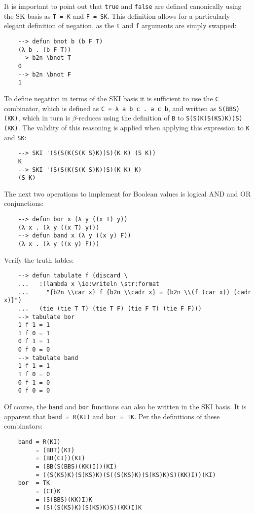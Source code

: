 It is important to point out that \verb|true| and \verb|false| are defined canonically using the SK basis as \verb|T = K| and \verb|F = SK|. This definition allows for a particularly elegant definition of negation, as the \verb|t| and \verb|f| arguments are simply swapped:

\begin{Verbatim}
    --> defun bnot b (b F T)
    (λ b . (b F T))
    --> b2n \bnot T
    0
    --> b2n \bnot F
    1
\end{Verbatim}

To define negation in terms of the SKI basis it is sufficient to use the \verb|C| combinator, which is defined as \verb|C = λ a b c . a c b|, and written as \verb|S(BBS)(KK)|, which in turn is $\beta$-reduces using the definition of \verb|B| to \verb|S(S(K(S(KS)K))S)(KK)|. The validity of this reasoning is applied when applying this expression to \verb|K| and \verb|SK|:

\begin{Verbatim}
    --> SKI '(S(S(K(S(K S)K))S)(K K) (S K))
    K
    --> SKI '(S(S(K(S(K S)K))S)(K K) K)
    (S K)
\end{Verbatim}

The next two operations to implement for Boolean values is logical AND and OR conjunctions:

\begin{Verbatim}
    --> defun bor x (λ y ((x T) y))
    (λ x . (λ y ((x T) y)))
    --> defun band x (λ y ((x y) F))
    (λ x . (λ y ((x y) F)))
\end{Verbatim}

Verify the truth tables:

\begin{Verbatim}
    --> defun tabulate f (discard \
    ...   :(lambda x \io:writeln \str:format
    ...     "{b2n \\car x} f {b2n \\cadr x} = {b2n \\(f (car x)) (cadr x)}")
    ...   (tie (tie T T) (tie T F) (tie F T) (tie F F)))
    --> tabulate bor
    1 f 1 = 1
    1 f 0 = 1
    0 f 1 = 1
    0 f 0 = 0
    --> tabulate band
    1 f 1 = 1
    1 f 0 = 0
    0 f 1 = 0
    0 f 0 = 0
\end{Verbatim}

Of course, the \verb|band| and \verb|bor| functions can also be written in the SKI basis. It is apparent that \verb|band = R(KI)| and \verb|bor = TK|. Per the definitions of these combinators:

\begin{Verbatim}
    band = R(KI)
         = (BBT)(KI)
         = (BB(CI))(KI)
         = (BB(S(BBS)(KK)I))(KI)
         = ((S(KS)K)(S(KS)K)(S((S(KS)K)(S(KS)K)S)(KK)I))(KI)
    bor  = TK
         = (CI)K
         = (S(BBS)(KK)I)K
         = (S((S(KS)K)(S(KS)K)S)(KK)I)K
\end{Verbatim}

